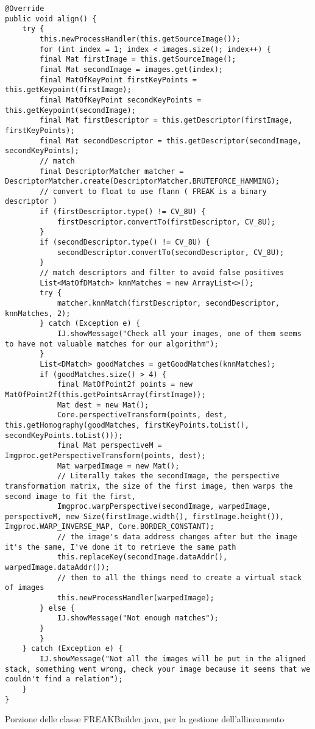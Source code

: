 \begin{listing}[H]
\begin{verbatim}
@Override
public void align() {
    try {
        this.newProcessHandler(this.getSourceImage());
        for (int index = 1; index < images.size(); index++) {
        final Mat firstImage = this.getSourceImage();
        final Mat secondImage = images.get(index);
        final MatOfKeyPoint firstKeyPoints = this.getKeypoint(firstImage);
        final MatOfKeyPoint secondKeyPoints = this.getKeypoint(secondImage);
        final Mat firstDescriptor = this.getDescriptor(firstImage, firstKeyPoints);
        final Mat secondDescriptor = this.getDescriptor(secondImage, secondKeyPoints);
        // match
        final DescriptorMatcher matcher = DescriptorMatcher.create(DescriptorMatcher.BRUTEFORCE_HAMMING);
        // convert to float to use flann ( FREAK is a binary descriptor )
        if (firstDescriptor.type() != CV_8U) {
            firstDescriptor.convertTo(firstDescriptor, CV_8U);
        }
        if (secondDescriptor.type() != CV_8U) {
            secondDescriptor.convertTo(secondDescriptor, CV_8U);
        }
        // match descriptors and filter to avoid false positives
        List<MatOfDMatch> knnMatches = new ArrayList<>();
        try {
            matcher.knnMatch(firstDescriptor, secondDescriptor, knnMatches, 2);
        } catch (Exception e) {
            IJ.showMessage("Check all your images, one of them seems to have not valuable matches for our algorithm");
        }
        List<DMatch> goodMatches = getGoodMatches(knnMatches);
        if (goodMatches.size() > 4) {
            final MatOfPoint2f points = new MatOfPoint2f(this.getPointsArray(firstImage));
            Mat dest = new Mat();
            Core.perspectiveTransform(points, dest, this.getHomography(goodMatches, firstKeyPoints.toList(), secondKeyPoints.toList()));
            final Mat perspectiveM = Imgproc.getPerspectiveTransform(points, dest);
            Mat warpedImage = new Mat();
            // Literally takes the secondImage, the perspective transformation matrix, the size of the first image, then warps the second image to fit the first, 
            Imgproc.warpPerspective(secondImage, warpedImage, perspectiveM, new Size(firstImage.width(), firstImage.height()), Imgproc.WARP_INVERSE_MAP, Core.BORDER_CONSTANT);
            // the image's data address changes after but the image it's the same, I've done it to retrieve the same path
            this.replaceKey(secondImage.dataAddr(), warpedImage.dataAddr());
            // then to all the things need to create a virtual stack of images
            this.newProcessHandler(warpedImage);
        } else {
            IJ.showMessage("Not enough matches");
        }
        }
    } catch (Exception e) {
        IJ.showMessage("Not all the images will be put in the aligned stack, something went wrong, check your image because it seems that we couldn't find a relation");
    }
}
\end{verbatim}
\caption{Porzione delle classe FREAKBuilder.java, per la gestione dell'allineamento}\label{lst:autoAlign}
\end{listing}


